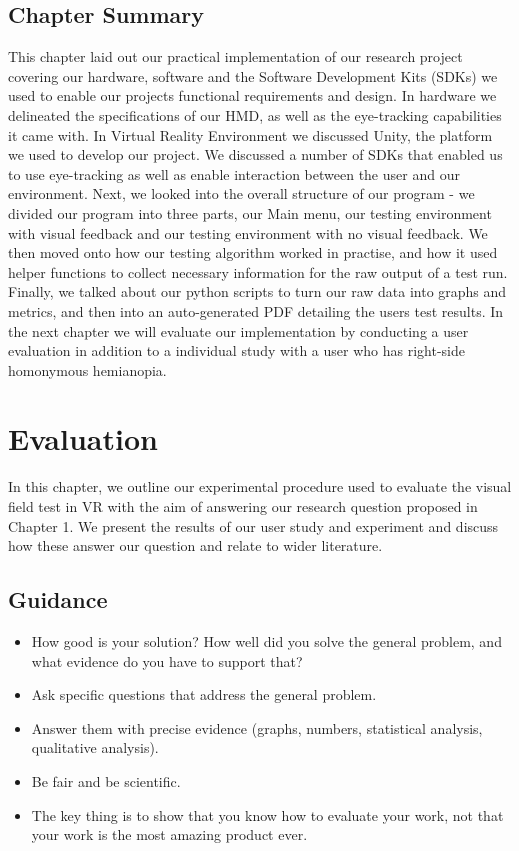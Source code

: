 \documentclass{l4proj}
\begin{document}
\section{Chapter Summary}
This chapter laid out our practical implementation of our research project covering our hardware, software and the Software Development Kits (SDKs) we used to enable our projects functional requirements and design. In hardware we delineated the specifications of our HMD, as well as the eye-tracking capabilities it came with. In Virtual Reality Environment we discussed Unity, the platform we used to develop our project. We discussed a number of SDKs that enabled us to use eye-tracking as well as enable interaction between the user and our environment. Next, we looked into the overall structure of our program - we divided our program into three parts, our Main menu, our testing environment with visual feedback and our testing environment with no visual feedback. We then moved onto how our testing algorithm worked in practise, and how it used helper functions to collect necessary information for the raw output of a test run. Finally, we talked about our python scripts to turn our raw data into graphs and metrics, and then into an auto-generated PDF detailing the users test results. In the next chapter we will evaluate our implementation by conducting a user evaluation in addition to a individual study with a user who has right-side homonymous hemianopia.
\chapter{Evaluation} 
In this chapter, we outline our experimental procedure used to evaluate the visual field test in VR with the aim of answering our research question proposed in Chapter 1. We present the results of our user study and experiment and discuss how these answer our question and relate to wider literature.

\section{Guidance}
\begin{itemize}
    \item How good is your solution? How well did you solve the general problem, and what evidence do you have to support that?
    \item
        Ask specific questions that address the general problem.
    \item
        Answer them with precise evidence (graphs, numbers, statistical
        analysis, qualitative analysis).
    \item
        Be fair and be scientific.
    \item
        The key thing is to show that you know how to evaluate your work, not
        that your work is the most amazing product ever.
\end{itemize}
\end{document}
